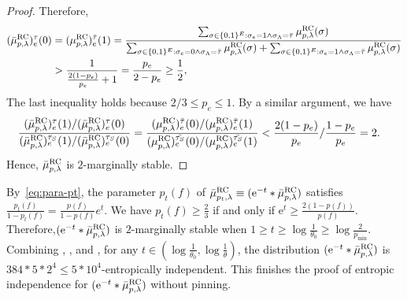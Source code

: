 \documentclass[11pt,a4paper]{article}
\newcommand{\e}{\mathrm{e}}
\theoremstyle{definition}
\begin{document}
\begin{proof}
Therefore, 
\begin{align*}
    (\bar{\mu}_{p,\lambda}^{\textnormal{RC}})_e^{\tau}(0)&=(\mu_{p,\lambda}^{\textnormal{RC}})_e^{\bar{\tau}}(1) = \frac{\sum_{\sigma \in \{0,1\}^E: \sigma_e = 1 \land \sigma_\Lambda = \bar{\tau} }\mu_{p,\lambda}^{\textnormal{RC}}(\sigma)}{\sum_{\sigma \in \{0,1\}^E: \sigma_e = 0 \land \sigma_\Lambda = \bar{\tau} }\mu_{p,\lambda}^{\textnormal{RC}}(\sigma)+\sum_{\sigma \in \{0,1\}^E: \sigma_e = 1 \land \sigma_\Lambda = \bar{\tau} }\mu_{p,\lambda}^{\textnormal{RC}}(\sigma)}\\
     &> \frac{1}{\frac{2(1-p_e)}{p_e}+1}= \frac{p_e}{2-p_e}\geq \frac{1}{2},
\end{align*}
The last inequality holds because $2/3\leq p_e\leq1$. By a similar argument, we have
\begin{align*}
    \frac{(\bar{\mu}_{p,\lambda}^{\textnormal{RC}})_e^{\tau}(1)/(\bar{\mu}_{p,\lambda}^{\textnormal{RC}})_e^{\tau}(0)}{(\bar{\mu}_{p,\lambda}^{\textnormal{RC}})_e^{\tau_S}(1)/(\bar{\mu}_{p,\lambda}^{\textnormal{RC}})_e^{\tau_S}(0)}=\frac{(\mu_{p,\lambda}^{\textnormal{RC}})_e^{\bar{\tau}}(0)/(\mu_{p,\lambda}^{\textnormal{RC}})_e^{\bar{\tau}}(1)}{(\mu_{p,\lambda}^{\textnormal{RC}})_e^{\bar{\tau_S}}(0)/(\mu_{p,\lambda}^{\textnormal{RC}})_e^{\bar{\tau_S}}(1)}&<\frac{2(1-p_e)}{p_e}/\frac{1-p_e}{p_e} = 2.
\end{align*}
Hence, $\bar{\mu}_{p,\lambda}^{\textnormal{RC}}$ is $2$-marginally stable.
\end{proof}


By~\eqref{eq:para-pt}, the parameter $p_t(f)$ of $\bar{\mu}_{p_t,\lambda}^{\textnormal{RC}}\equiv(\e^{-t}*\bar{\mu}_{p,\lambda}^{\textnormal{RC}})$ satisfies $\frac{p_t(f)}{1-p_t(f)} = \frac{p(f)}{1-p(f)} e^t$. We have $p_t(f)\geq \frac{2}{3}$ if and only if $\e^t\geq \frac{2(1-p(f))}{p(f)}$. Therefore,$(\e^{-t} * \bar{\mu}_{p,\lambda}^{\textnormal{RC}})$ is $2$-marginally stable when $1\geq t\geq \log \frac{1}{\theta_0}\geq\log \frac{2}{p_{\min}}$. Combining , , and , for any $t \in (\log\frac{1}{\theta_0},\log \frac{1}{\theta})$, the distribution $(\e^{-t} * \bar{\mu}_{p,\lambda}^{\textnormal{RC}})$ is $384 * 5 * 2^4\leq 5*10^4$-entropically independent. This finishes the proof of entropic independence for $(\e^{-t}*\bar{\mu}_{p,\lambda}^{\textnormal{RC}})$ without pinning.
\end{document}
